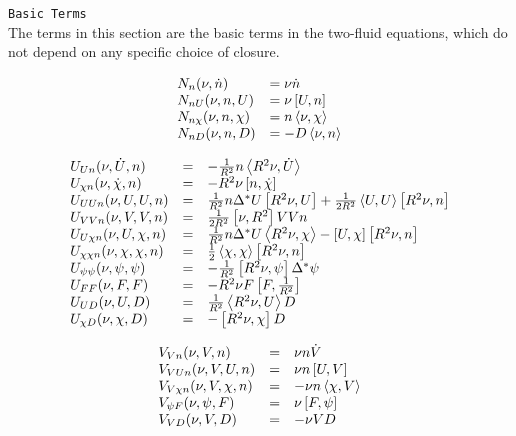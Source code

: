 \texttt{Basic Terms}
\\
The terms in this section are the basic terms in the two-fluid
equations, which do not depend on any specific choice of closure.

\begin{equation}
  \begin{array}{ll}
  N_n(\nu, \dot{n}) & = \nu \dot{n}\\
  N_{n U}(\nu, n, U) & = \nu \left[U,n\right]\\
  N_{n \chi}(\nu, n, \chi) & = n \left\langle \nu,\chi\right\rangle\\
  N_{n D}(\nu, n, D) & = - D \left\langle \nu,n\right\rangle
  \end{array}
\end{equation}

\begin{equation}
  \begin{array}{lcl}
    U_{U n}(\nu, \dot U, n) & = & -\frac{1}{R^2} n \left\langle R^2 \nu,\dot{U}\right\rangle
    \\
    U_{\chi n}(\nu, \dot \chi, n) & = & -R^2 \nu \left[n,\dot{\chi}\right]
    \\
    U_{U U n}(\nu, U, U, n) & = & \frac{1}{R^2} n \Delta^* U \left[R^2\nu,U\right]
      + \frac{1}{2 R^2} \left\langle U,U\right\rangle\left[R^2\nu,n\right]
    \\
    U_{V V n}(\nu, V,  V, n) & = &  \frac{1}{2 R^2} \left[\nu,R^2\right] V V n
    \\
    U_{U \chi n}(\nu, U, \chi, n) & = & 
      \frac{1}{R^2}n \Delta^* U\left\langle R^2\nu,\chi\right\rangle 
      - \left[U,\chi\right] \left[R^2\nu,n\right]
    \\
    U_{\chi \chi n}(\nu, \chi, \chi, n) & = &
      \frac{1}{2} \left\langle \chi,\chi\right\rangle \left[R^2 \nu,n\right]
    \\
    U_{\psi \psi}(\nu, \psi, \psi) & = &
      -\frac{1}{R^2} \left[R^2 \nu,\psi\right] \Delta^* \psi
    \\
    U_{F F}(\nu, F, F) & = & -R^2 \nu F \left[F,\frac{1}{R^2}\right]
    \\
    U_{U D}(\nu, U, D) & = & \frac{1}{R^2} \left\langle R^2 \nu,U\right\rangle D
    \\
    U_{\chi D}(\nu, \chi, D) & = & -\left[R^2 \nu,\chi\right] D
  \end{array}
\end{equation}

\begin{equation}
  \begin{array}{lcl}
    V_{V n}(\nu, V, n) & = & \nu n \dot{V}\\
    V_{V U n}(\nu, V, U, n) & = & \nu n \left[U,V\right]\\
    V_{V \chi n}(\nu, V, \chi, n) & = & -\nu n \left\langle \chi,V\right\rangle\\
    V_{\psi F}(\nu, \psi, F) & = & \nu \left[F,\psi\right]\\
    V_{V D}(\nu, V, D) & = & -\nu V D
  \end{array}
\end{equation}    

